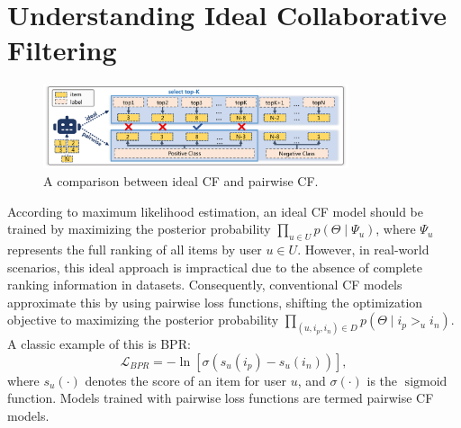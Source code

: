 \section{Understanding Ideal Collaborative Filtering }
\begin{figure}[t]
  \centering
\includegraphics[width=0.8\textwidth]{fig/model.pdf}
  \caption{A comparison between ideal CF and pairwise CF.}
  \label{fig:nips}
\end{figure}
According to maximum likelihood estimation, an ideal CF model should be trained by maximizing the posterior probability $\prod_ {u \in U}p(\Theta \mid \Psi_u)$, where $\Psi_u$ represents the full ranking of all items by user $u \in U$. However, in real-world scenarios, this ideal approach is impractical due to the absence of complete ranking information in datasets. Consequently, conventional CF models approximate this by using pairwise loss functions, shifting the optimization objective to maximizing the posterior probability $\prod_ {(u, i_p, i_n) \in D}p(\Theta \mid i_p>_{u} i_n)$. A classic example of this is BPR:
\begin{equation}
\mathcal{L}_{BPR}= -\ln [\sigma(s_u(i_p) - s_u(i_n))],
\label{eq:bpr}
\end{equation}
where $s_u(\cdot)$ denotes the score of an item for user $u$, and $\sigma(\cdot)$ is the $\operatorname{sigmoid}$ function. Models trained with pairwise loss functions are termed pairwise CF models. 

